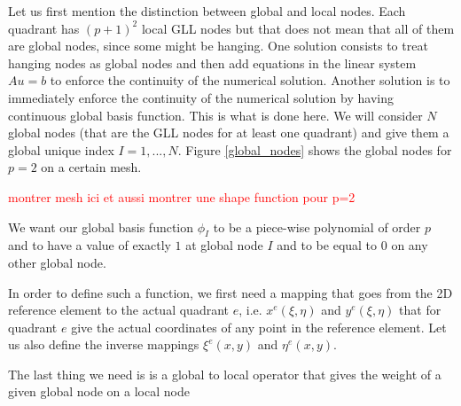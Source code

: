 Let us first mention the distinction between global and local nodes. Each quadrant has $(p+1)^2$ local GLL nodes but that does not mean that all of them are global nodes, since some might be hanging. One solution consists to treat hanging nodes as global nodes and then add equations in the linear system $Au=b$ to enforce the continuity of the numerical solution. Another solution is to immediately enforce the continuity of the numerical solution by having continuous global basis function. This is what is done here. We will consider $N$ global nodes (that are the GLL nodes for at least one quadrant) and give them a global unique index $I = 1,...,N$. Figure \ref{global_nodes} shows the global nodes for $p=2$ on a certain mesh. 

\textcolor{red}{montrer mesh ici et aussi montrer une shape function pour p=2}


We want our global basis function $\phi_I$ to be a piece-wise polynomial of order $p$ and to have a value of exactly $1$ at global node $I$ and to be equal to $0$ on any other global node. 

In order to define such a function, we first need a mapping that goes from the 2D reference element to the actual quadrant $e$, i.e. $x^e(\xi,\eta)$ and $y^e(\xi,\eta)$ that for quadrant $e$ give the actual coordinates of any point in the reference element. Let us also define the inverse mappings $\xi^e(x,y)$ and $\eta^e(x,y)$. 

The last thing we need is is a global to local operator that gives the weight of a given global node on a local node 





